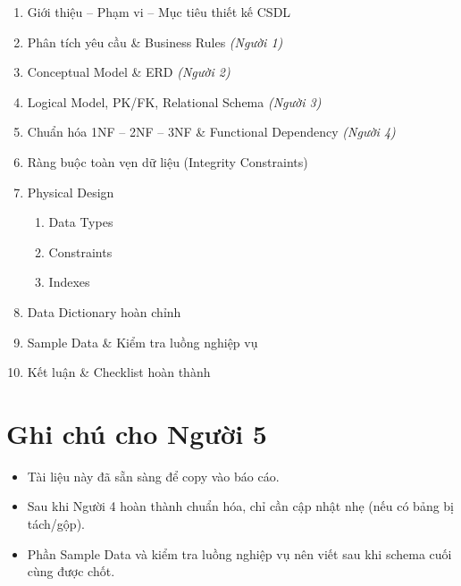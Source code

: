 \documentclass[12pt,a4paper]{article}
\begin{document}
\begin{enumerate}[leftmargin=*]
  \item Giới thiệu -- Phạm vi -- Mục tiêu thiết kế CSDL
  \item Phân tích yêu cầu \& Business Rules \hfill \textit{(Người 1)}
  \item Conceptual Model \& ERD \hfill \textit{(Người 2)}
  \item Logical Model, PK/FK, Relational Schema \hfill \textit{(Người 3)}
  \item Chuẩn hóa 1NF -- 2NF -- 3NF \& Functional Dependency \hfill \textit{(Người 4)}
  \item Ràng buộc toàn vẹn dữ liệu (Integrity Constraints)
  \item Physical Design
  \begin{enumerate}[label=\arabic*.]
    \item Data Types
    \item Constraints
    \item Indexes
  \end{enumerate}
  \item Data Dictionary hoàn chỉnh
  \item Sample Data \& Kiểm tra luồng nghiệp vụ
  \item Kết luận \& Checklist hoàn thành
\end{enumerate}

\section{Ghi chú cho Người 5}
\begin{itemize}
  \item Tài liệu này đã sẵn sàng để copy vào báo cáo.
  \item Sau khi Người 4 hoàn thành chuẩn hóa, chỉ cần cập nhật nhẹ (nếu có bảng bị tách/gộp).
  \item Phần Sample Data và kiểm tra luồng nghiệp vụ nên viết sau khi schema cuối cùng được chốt.
\end{itemize}
\end{document}
